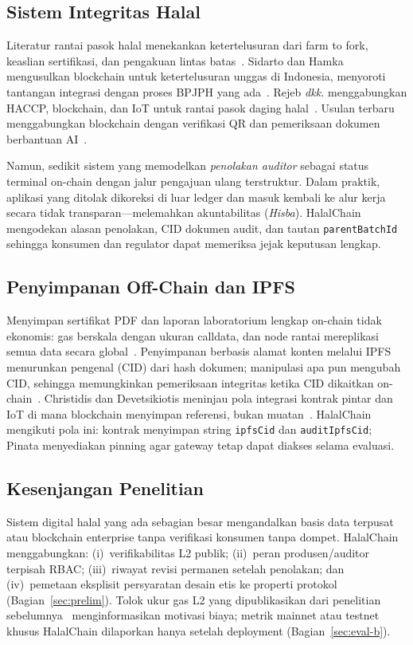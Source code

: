 \subsection{Sistem Integritas Halal}
Literatur rantai pasok halal menekankan ketertelusuran dari farm to fork, keaslian sertifikasi, dan pengakuan lintas batas~\cite{sidarto2021halal,rejeb2018halal,rashid2018halal}.
Sidarto dan Hamka mengusulkan blockchain untuk ketertelusuran unggas di Indonesia, menyoroti tantangan integrasi dengan proses BPJPH yang ada~\cite{sidarto2021halal}.
Rejeb \emph{dkk.} menggabungkan HACCP, blockchain, dan IoT untuk rantai pasok daging halal~\cite{rejeb2018halal}.
Usulan terbaru menggabungkan blockchain dengan verifikasi QR dan pemeriksaan dokumen berbantuan AI~\cite{alourani2025halal,marianingsih2024halal}.

Namun, sedikit sistem yang memodelkan \emph{penolakan auditor} sebagai status terminal on-chain dengan jalur pengajuan ulang terstruktur.
Dalam praktik, aplikasi yang ditolak dikoreksi di luar ledger dan masuk kembali ke alur kerja secara tidak transparan---melemahkan akuntabilitas (\emph{Hisba}).
HalalChain mengodekan alasan penolakan, CID dokumen audit, dan tautan \texttt{parentBatchId} sehingga konsumen dan regulator dapat memeriksa jejak keputusan lengkap.

\subsection{Penyimpanan Off-Chain dan IPFS}
Menyimpan sertifikat PDF dan laporan laboratorium lengkap on-chain tidak ekonomis: gas berskala dengan ukuran calldata, dan node rantai mereplikasi semua data secara global~\cite{benet2014ipfs,christidis2016blockchain}.
Penyimpanan berbasis alamat konten melalui IPFS menurunkan pengenal (CID) dari hash dokumen; manipulasi apa pun mengubah CID, sehingga memungkinkan pemeriksaan integritas ketika CID dikaitkan on-chain~\cite{benet2014ipfs}.
Christidis dan Devetsikiotis meninjau pola integrasi kontrak pintar dan IoT di mana blockchain menyimpan referensi, bukan muatan~\cite{christidis2016blockchain}.
HalalChain mengikuti pola ini: kontrak menyimpan string \texttt{ipfsCid} dan \texttt{auditIpfsCid}; Pinata menyediakan pinning agar gateway tetap dapat diakses selama evaluasi.

\subsection{Kesenjangan Penelitian}
Sistem digital halal yang ada sebagian besar mengandalkan basis data terpusat atau blockchain enterprise tanpa verifikasi konsumen tanpa dompet.
HalalChain menggabungkan: (i)~verifikabilitas L2 publik; (ii)~peran produsen/auditor terpisah RBAC; (iii)~riwayat revisi permanen setelah penolakan; dan (iv)~pemetaan eksplisit persyaratan desain etis ke properti protokol (Bagian~\ref{sec:prelim}).
Tolok ukur gas L2 yang dipublikasikan dari penelitian sebelumnya~\cite{kalodner2018arbitrum} menginformasikan motivasi biaya; metrik mainnet atau testnet khusus HalalChain dilaporkan hanya setelah deployment (Bagian~\ref{sec:eval-b}).
